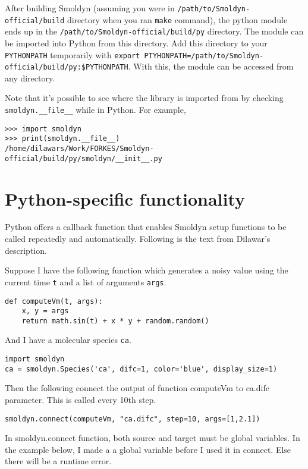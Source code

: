 \documentclass {book}
\begin{document}
After building Smoldyn (assuming you were in \texttt{/path/to/Smoldyn-official/build} directory when you ran \texttt{make} command), the python module ends up in the \texttt{/path/to/Smoldyn-official/build/py} directory. The module can be imported into Python from this directory. Add this directory to your
\texttt{PYTHONPATH} temporarily with \texttt{export PTYHONPATH=/path/to/Smoldyn-official/build/py:\$PYTHONPATH}. With this, the module can be accessed from any directory.

Note that it's possible to see where the library is imported from by checking
\verb|smoldyn.__file__| while in Python. For example,

\begin{verbatim}
>>> import smoldyn
>>> print(smoldyn.__file__)
/home/dilawars/Work/FORKES/Smoldyn-official/build/py/smoldyn/__init__.py
\end{verbatim}


\section{Python-specific functionality}

Python offers a callback function that enables Smoldyn setup functions to be called repeatedly and automatically. Following is the text from Dilawar's description.

Suppose I have the following function which generates a noisy value using the current time \texttt{t} and a list of arguments \texttt{args}.

\begin{verbatim}
def computeVm(t, args):
    x, y = args 
    return math.sin(t) + x * y + random.random()
\end{verbatim}

And I have a molecular species \texttt{ca}.

\begin{verbatim}
import smoldyn
ca = smoldyn.Species('ca', difc=1, color='blue', display_size=1)
\end{verbatim}
Then the following connect the output of function computeVm to ca.difc parameter. This is called every 10th step.

\begin{verbatim}
smoldyn.connect(computeVm, "ca.difc", step=10, args=[1,2.1])
\end{verbatim}

In smoldyn.connect function, both source and target must be global variables. In the example below, I made a a global variable before I used it in connect. Else there will be a runtime error.
\end{document}
